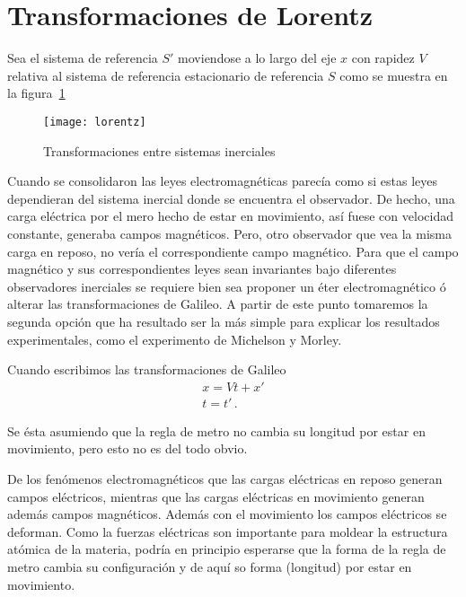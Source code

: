 \section{Transformaciones de Lorentz}
\begin{frame}
Sea el sistema de referencia $S'$ moviendose a lo largo del eje $x$ con rapidez $V$ relativa al sistema de referencia estacionario de referencia $S$ como se muestra en la figura~\ref{fig:lorentz}
\begin{figure}
  \centering
  \texttt{[image: lorentz]}
  \caption{Transformaciones entre sistemas inerciales}
  \label{fig:lorentz}
\end{figure}

\begin{details}
Cuando se consolidaron las leyes electromagnéticas parecía como si
estas leyes dependieran del sistema inercial donde se encuentra el
observador. De hecho, una carga eléctrica por el mero hecho de estar
en movimiento, así fuese con velocidad constante, generaba campos
magnéticos. Pero, otro observador que vea la misma carga en reposo, no
vería el correspondiente campo magnético. Para que el campo magnético
y sus correspondientes leyes sean invariantes bajo diferentes
observadores inerciales se requiere bien sea proponer un éter
electromagnético ó alterar las transformaciones de Galileo. A partir
de este punto tomaremos la segunda opción que ha resultado ser la más
simple para explicar los resultados experimentales, como el
experimento de Michelson y Morley.
\end{details}

Cuando escribimos las transformaciones de Galileo
\begin{align*}
  x=Vt+x'\nonumber\\
  t=t'\,.
\end{align*}



Se ésta asumiendo que la regla de metro no cambia su longitud por estar en movimiento, pero esto no es del todo obvio. 
\begin{details}
De los fenómenos electromagnéticos que las cargas eléctricas en reposo generan campos eléctricos, mientras que las cargas eléctricas en movimiento generan además campos magnéticos. Además con el movimiento los campos eléctricos se deforman. Como la fuerzas eléctricas son importante para moldear la estructura atómica de la materia, podría en principio esperarse que la forma de la regla de metro cambia su configuración y de aquí so forma (longitud) por estar en movimiento. 
\end{details}





\end{frame}
